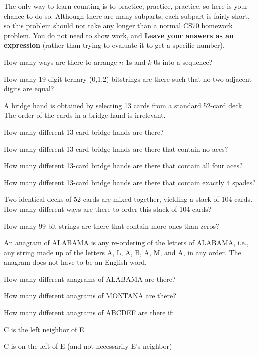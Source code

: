 \documentclass[11pt]{article}
\begin{document}
The only way to learn counting is to practice, practice, practice, so
here is your chance to do so. Although there are many subparts, each subpart is fairly short, so this problem should not take any longer than a normal CS70 homework problem. You do not need to show work, and
\textbf{Leave your answers as an expression} (rather than
trying to evaluate it to get a specific number).
\begin{Parts}

\Part How many ways are there to arrange $n$ 1s and $k$ 0s into a sequence?

\Part How many 19-digit ternary (0,1,2) bitstrings are there such that no two adjacent digits are equal?

\Part A bridge hand is obtained by selecting 13 cards from a standard
  52-card deck. The order of the cards in a bridge hand is
  irrelevant.
  \begin{Parts}
    \item How many different 13-card bridge hands are there? 
    \item How many different 13-card bridge hands are there that contain no aces? 
    \item How many different 13-card bridge hands are there that contain all four aces? 
    \item How many different 13-card bridge hands are there that contain exactly 4 spades?
  \end{Parts}

\Part Two identical decks of 52 cards are mixed together, yielding a
  stack of 104 cards.
  How many different ways are there to order this stack of 104 cards?
  
\Part How many 99-bit strings are there that contain more ones than
  zeros?
  
\Part An anagram of ALABAMA is any re-ordering of the letters of ALABAMA, i.e., any
  string made up of the letters A, L, A, B, A, M, and A, in any order.
  The anagram does not have to be an English word.
  \begin{Parts}
    \item How many different anagrams of ALABAMA are there? 
    \item How many different anagrams of MONTANA are there?
  \end{Parts}
 
\Part How many different anagrams of ABCDEF are there if:
\begin{Parts}
  \item C is the left neighbor of E
  \item C is on the left of E (and not necessarily E's neighbor)
\end{Parts}


\end{Parts}
\end{document}
